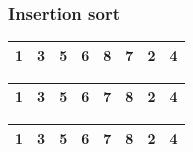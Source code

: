 \begin{frame}
\frametitle{Insertion sort}
\begin{table}
\begin{tabular}{| c | c | c | c | c | c | c | c |}
\hline
\cellcolor{blue!25}1 & \cellcolor{blue!25}3 & \cellcolor{blue!25}5 & \cellcolor{blue!25}6 & \cellcolor{blue!25}8 & \cellcolor{red!25}7 & 2 & 4 \\ 
\hline
\end{tabular}
\end{table}
\begin{table}
\begin{tabular}{| c | c | c | c | c | c | c | c |}
\hline
\cellcolor{blue!25}1 & \cellcolor{blue!25}3 & \cellcolor{blue!25}5 & \cellcolor{blue!25}6 & \cellcolor{red!25}7 & \cellcolor{blue!25}8 & 2 & 4 \\ 
\hline
\end{tabular}
\end{table}
\begin{table}
\begin{tabular}{| c | c | c | c | c | c | c | c |}
\hline
\cellcolor{blue!25}1 & \cellcolor{blue!25}3 & \cellcolor{blue!25}5 & \cellcolor{blue!25}6 & \cellcolor{blue!25}7 & \cellcolor{blue!25}8 & 2 & 4 \\ 
\hline
\end{tabular}
\end{table}
\end{frame}

